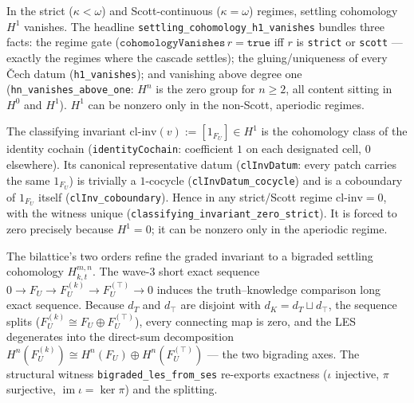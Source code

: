 \begin{theorem}\label{thm:h1-zero-iff-confluent}\leanok{}
In the strict ($\kappa < \omega$) and Scott-continuous ($\kappa = \omega$) regimes, settling cohomology $H^1$ vanishes. The headline \texttt{settling\_cohomology\_h1\_vanishes} bundles three facts: the regime gate ($\texttt{cohomologyVanishes}\,r = \texttt{true}$ iff $r$ is \texttt{strict} or \texttt{scott} --- exactly the regimes where the cascade settles); the gluing/uniqueness of every \v{C}ech datum (\texttt{h1\_vanishes}); and vanishing above degree one (\texttt{hn\_vanishes\_above\_one}: $H^n$ is the zero group for $n \geq 2$, all content sitting in $H^0$ and $H^1$). $H^1$ can be nonzero only in the non-Scott, aperiodic regimes.
\end{theorem}

\begin{theorem}\leanok{}
The classifying invariant $\mathrm{cl\text{-}inv}(v) := [1_{F_U}] \in H^1$ is the cohomology class of the identity cochain (\texttt{identityCochain}: coefficient $1$ on each designated cell, $0$ elsewhere). Its canonical representative datum (\texttt{clInvDatum}: every patch carries the same $1_{F_U}$) is trivially a $1$-cocycle (\texttt{clInvDatum\_cocycle}) and is a coboundary of $1_{F_U}$ itself (\texttt{clInv\_coboundary}). Hence in any strict/Scott regime $\mathrm{cl\text{-}inv} = 0$, with the witness unique (\texttt{classifying\_invariant\_zero\_strict}). It is forced to zero precisely because $H^1 = 0$; it can be nonzero only in the aperiodic regime.
\end{theorem}

\begin{remark}\leanok{}
The bilattice's two orders refine the graded invariant to a bigraded settling cohomology $H^{m,n}_{k,t}$. The wave-3 short exact sequence $0 \to F_U \to F_U^{(k)} \to F_U^{(\top)} \to 0$ induces the truth--knowledge comparison long exact sequence. Because $d_T$ and $d_\top$ are disjoint with $d_K = d_T \sqcup d_\top$, the sequence splits ($F_U^{(k)} \cong F_U \oplus F_U^{(\top)}$), every connecting map is zero, and the LES degenerates into the direct-sum decomposition $H^n(F_U^{(k)}) \cong H^n(F_U) \oplus H^n(F_U^{(\top)})$ --- the two bigrading axes. The structural witness \texttt{bigraded\_les\_from\_ses} re-exports exactness ($\iota$ injective, $\pi$ surjective, $\operatorname{im}\iota = \ker\pi$) and the splitting.
\end{remark}

